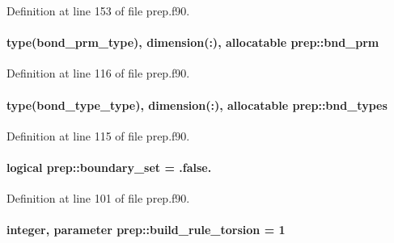 Definition at line 153 of file prep.\-f90.

\hypertarget{classprep_ac427697c7ffa6252f064c2203abbc8d1}{
\paragraph[{bnd\-\_\-prm}]{\setlength{\rightskip}{0pt plus 5cm}type({\bf bond\-\_\-prm\-\_\-type}), dimension(\-:), allocatable prep\-::bnd\-\_\-prm}}\label{classprep_ac427697c7ffa6252f064c2203abbc8d1}


Definition at line 116 of file prep.\-f90.

\hypertarget{classprep_a8612d16f438fce2fdfab421435fc12b0}{
\paragraph[{bnd\-\_\-types}]{\setlength{\rightskip}{0pt plus 5cm}type({\bf bond\-\_\-type\-\_\-type}), dimension(\-:), allocatable prep\-::bnd\-\_\-types}}\label{classprep_a8612d16f438fce2fdfab421435fc12b0}


Definition at line 115 of file prep.\-f90.

\hypertarget{classprep_a7a6bd6d143339e8bfd4eca5c729d53fc}{
\paragraph[{boundary\-\_\-set}]{\setlength{\rightskip}{0pt plus 5cm}logical prep\-::boundary\-\_\-set = .false.}}\label{classprep_a7a6bd6d143339e8bfd4eca5c729d53fc}


Definition at line 101 of file prep.\-f90.

\hypertarget{classprep_a853f496291d4e6336bc962adf492d392}{
\paragraph[{build\-\_\-rule\-\_\-torsion}]{\setlength{\rightskip}{0pt plus 5cm}integer, parameter prep\-::build\-\_\-rule\-\_\-torsion = 1}}\label{classprep_a853f496291d4e6336bc962adf492d392}


